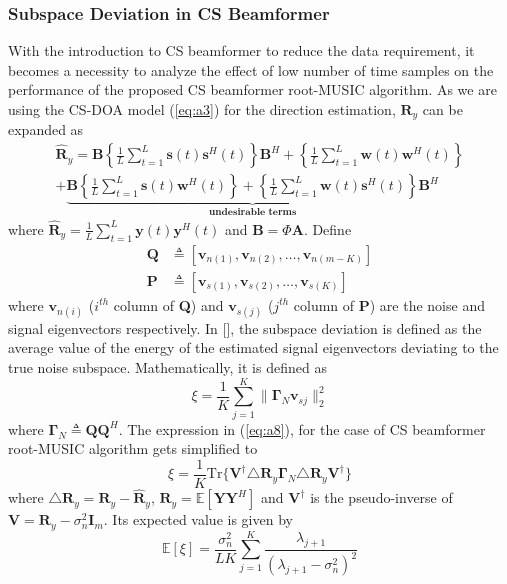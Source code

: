 \documentclass[12pt,a4paper]{article}
\theoremstyle{plain}
\theoremstyle{definition}
\begin{document}
\subsubsection{Subspace Deviation in CS Beamformer}
With the introduction to CS beamformer to reduce the data requirement, it becomes a necessity to analyze the effect of low number of time samples on the performance of the proposed CS beamformer root-MUSIC algorithm. As we are using the CS-DOA model (\ref{eq:a3}) for the direction estimation, $\textbf{R}_{y}$ can be expanded as
\begin{align}
\widehat{\textbf{R}}_{y} = \textbf{B}\left\{\frac{1}{L}\sum_{t=1}^{L}\textbf{s}(t)\textbf{s}^H(t)\right\}\textbf{B}^H + \left\{\frac{1}{L}\sum_{t=1}^{L}\textbf{w}(t)\textbf{w}^H(t)\right\} \nonumber\\+ \underbrace{\textbf{B}\left\{\frac{1}{L}\sum_{t=1}^{L}\textbf{s}(t)\textbf{w}^H(t)\right\} + \left\{\frac{1}{L}\sum_{t=1}^{L}\textbf{w}(t)\textbf{s}^H(t)\right\}\textbf{B}^H}_\textbf{undesirable terms}
\end{align}
\noindent where $\widehat{\textbf{R}}_{y} = \frac{1}{L}\sum_{t=1}^L\textbf{y}(t)\textbf{y}^H(t)$ and $\textbf{B} = \Phi \textbf{A}$.
Define 
\begin{align*}
\textbf{Q} &\triangleq [\textbf{v}_{n(1)}, \textbf{v}_{n(2)}, \hdots, \textbf{v}_{n(m - K)}]\\
\textbf{P} &\triangleq [\textbf{v}_{s(1)}, \textbf{v}_{s(2)}, \hdots, \textbf{v}_{s(K)}]
\end{align*} 
where $\textbf{v}_{n(i)}$ ($\textit{i}^{th}$ column of \textbf{Q}) and $\textbf{v}_{s(j)}$ ($\textit{j}^{th}$ column of \textbf{P}) are the noise and signal eigenvectors respectively. In [\citet{R35}], the subspace deviation is defined as the average value of the energy of the estimated signal eigenvectors deviating to the true noise subspace. Mathematically, it is defined as
\begin{equation}\label{eq:a8}
\xi = \frac{1}{K}\sum_{j=1}^{K}\parallel\bm{\Gamma}_N\textbf{v}_{sj}\parallel_2^2
\end{equation}  
\noindent where \(\bm{\Gamma}_N \triangleq \textbf{Q}\textbf{Q}^H\). 
The expression in (\ref{eq:a8}), for the case of CS beamformer root-MUSIC algorithm gets simplified to 
\begin{equation}\label{eq:a9}
\xi = \frac{1}{K}\text{Tr}\{\textbf{V}^\dagger \triangle \textbf{R}_{y} \bm{\Gamma}_N \triangle \textbf{R}_{y} \textbf{V}^\dagger\}
\end{equation}  
\noindent where $\triangle \textbf{R}_{y}= \textbf{R}_{y} - \widehat{\textbf{R}}_{y}$, \(\textbf{R}_{y} =\mathbb{E}[\textbf{YY}^H]\) and $\textbf{V}^\dagger$ is the pseudo-inverse of $\textbf{V} = \textbf{R}_{y} - \sigma_n^2\textbf{I}_m$. Its expected value is given by 
\begin{equation}\label{eq:a10}
\mathbb{E}[\xi] = \frac{\sigma_n^2}{LK}\sum_{j=1}^{K}\frac{\lambda_{j+1}}{( \lambda_{j+1} - \sigma_n^2 )^2}
\end{equation}  
\end{document}
